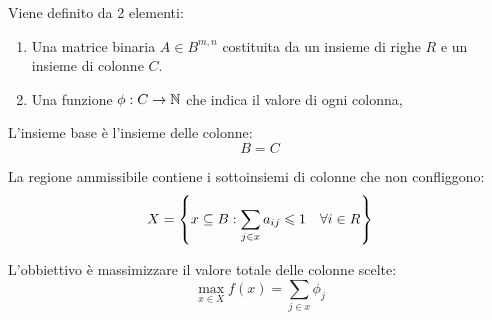 \documentclass[\main/main.tex]{subfiles}
\begin{document}
\begin{multicols}{2}
\begin{problem}
        Viene definito da 2 elementi:
        \begin{enumerate}
            \item Una matrice binaria \(A \in B^{m,n}\) costituita da un insieme di righe \(R\) e un insieme di colonne \(C\).
            \item Una funzione \(\phi : C \rightarrow \mathbb{N}\) che indica il valore di ogni colonna,
        \end{enumerate}
    \end{problem}
    \begin{definition}
        L'insieme base è l'insieme delle colonne:
        \[
            B = C
        \]
    \end{definition}
    \begin{definition}
        La regione ammissibile contiene i sottoinsiemi di colonne che non confliggono:
        \[
            X = \left\{x \subseteq B: \sum_{j \in x} a_{ij} \leqslant 1 \quad \forall i \in R\right\}
        \]
    \end{definition}
    \begin{definition}
        L'obbiettivo è massimizzare il valore totale delle colonne scelte:
        \[
            \max_{x \in X} f(x) = \sum_{j \in x} \phi_{j}
        \]
    \end{definition}
\end{multicols}
\clearpage
\end{document}
